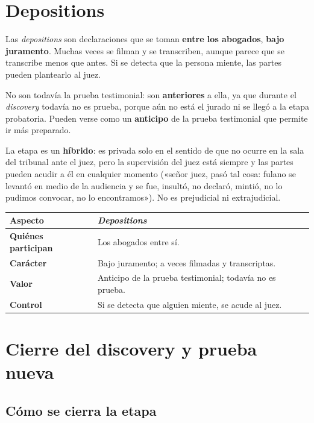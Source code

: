 \documentclass[12pt,oneside]{book}
\begin{document}
\section{Depositions}

Las \textit{depositions} son declaraciones que se toman \textbf{entre los abogados}, \textbf{bajo juramento}. Muchas veces se filman y se transcriben, aunque parece que se transcribe menos que antes. Si se detecta que la persona miente, las partes pueden plantearlo al juez.

No son todavía la prueba testimonial: son \textbf{anteriores} a ella, ya que durante el \textit{discovery} todavía no es prueba, porque aún no está el jurado ni se llegó a la etapa probatoria. Pueden verse como un \textbf{anticipo} de la prueba testimonial que permite ir más preparado.

La etapa es un \textbf{híbrido}: es privada solo en el sentido de que no ocurre en la sala del tribunal ante el juez, pero la supervisión del juez está siempre y las partes pueden acudir a él en cualquier momento («señor juez, pasó tal cosa: fulano se levantó en medio de la audiencia y se fue, insultó, no declaró, mintió, no lo pudimos convocar, no lo encontramos»). No es prejudicial ni extrajudicial.

\begin{table}[H]
\centering
\begin{tabularx}{\textwidth}{P{3.2cm}L}
\toprule
\textbf{Aspecto} & \textbf{\textit{Depositions}} \\
\midrule
\textbf{Quiénes participan} & Los abogados entre sí. \\
\textbf{Carácter} & Bajo juramento; a veces filmadas y transcriptas. \\
\textbf{Valor} & Anticipo de la prueba testimonial; todavía no es prueba. \\
\textbf{Control} & Si se detecta que alguien miente, se acude al juez. \\
\bottomrule
\end{tabularx}
\end{table}

\section{Cierre del discovery y prueba nueva}

\subsection{Cómo se cierra la etapa}
\end{document}
